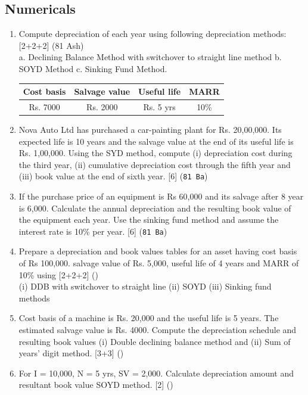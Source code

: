 \documentclass[12pt]{article}
\begin{document}
	\subsection{Numericals}
		\begin{enumerate}
			\item Compute depreciation of each year using following depreciation methods: \hfill [2+2+2] (81 Ash)\\
			a. Declining Balance Method with switchover to straight line method
			b. SOYD Method
			c. Sinking Fund Method.\\
			\begin{tabular}{|c|c|c|c|}
				\hline
				Cost basis & Salvage value & Useful life & MARR \\ \hline
				Rs. 7000 & Rs. 2000 & Rs. 5 yrs & 10\% \\ \hline
			\end{tabular}

			\item Nova Auto Ltd has purchased a car-painting plant for Rs. 20,00,000. Its expected life is 10 years and the salvage value at the end of its useful life is Rs. 1,00,000. Using the SYD method, compute (i) depreciation cost during the third year, (ii) cumulative depreciation cost through the fifth year and (iii) book value at the end of sixth year. \hfill [6] (\texttt{81 Ba})

			\item If the purchase price of an equipment is Rs 60,000 and its salvage after 8 year is 6,000. Calculate the annual depreciation and the resulting book value of the equipment each year. Use the sinking fund method and assume the interest rate is 10\% per year. \hfill [6] (\texttt{81 Ba})

			\item Prepare a depreciation and book values tables for an asset having cost basis of Rs 100,000. salvage value of Rs. 5,000, useful life of 4 years and MARR of 10\% using \hfill [2+2+2] ()\\
			(i) DDB with switchover to straight line (ii) SOYD (iii) Sinking fund methods

			\item Cost basis of a machine is Rs. 20,000 and the useful life is 5 years. The estimated salvage value is Rs. 4000. Compute the depreciation schedule and resulting book values (i) Double declining balance method and (ii) Sum of years' digit method. \hfill [3+3] ()

			\item For I = 10,000, N = 5 yrs, SV = 2,000. Calculate depreciation amount and resultant book value SOYD method. \hfill [2] ()


\end{enumerate}
\end{document}
